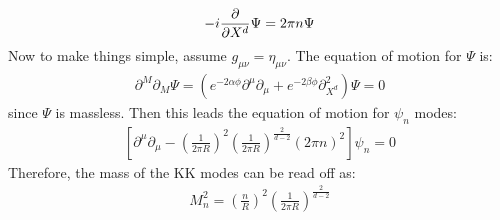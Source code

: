 \begin{align}
    -i\pdv{X^{d}} \Psi = 2\pi n \Psi
\end{align}
Now to make things simple, assume $g_{\mu\nu} = \eta _{\mu\nu}$. The equation of motion for $\Psi$ is:
\begin{align}
    \partial ^{M} \partial _{M} \Psi = (e^{-2\alpha \phi} \partial ^{\mu} \partial _{\mu} + e^{-2\beta \phi} \partial _{X^{d}}^{2}) \Psi = 0
\end{align}
since $\Psi$ is massless. Then this leads the equation of motion for $\psi _n$ modes:
\begin{align}
    \left[\partial ^{\mu}\partial _{\mu}- (\frac{1}{2\pi R})^{2} (\frac{1}{2 \pi R})^{\frac{2}{d-2}} (2\pi n)^{2}  \right] \psi _{n} = 0
\end{align}
Therefore, the mass of the KK modes can be read off as:
\begin{align}
    M_{n} ^{2}= (\frac{n}{R})^{2} (\frac{1}{2 \pi R})^{\frac{2}{d-2}}
\end{align}

